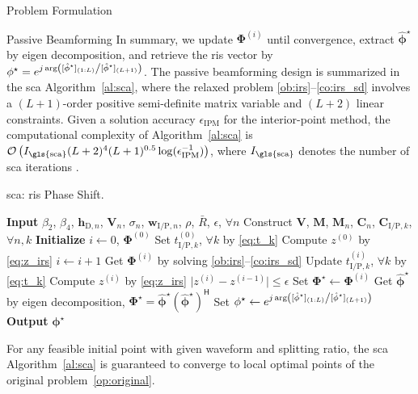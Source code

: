 \begin{section}{Problem Formulation}
\begin{subsection}{Passive Beamforming}
		In summary, we update $\mathbf{\Phi}^{(i)}$ until convergence, extract $\hat{\mathbf{\phi}}^\star$ by eigen decomposition, and retrieve the	\gls{ris} vector by $\mathbf{\phi}^{\star}=e^{j \arg\left([\hat{\mathbf{\phi}}^\star]_{(1:L)} \middle/ [\hat{\mathbf{\phi}}^\star]_{(L+1)}\right)}$. The passive beamforming design is summarized in the \gls{sca} Algorithm~\ref{al:sca}, where the relaxed problem \eqref{ob:irs}--\eqref{co:irs_sd} involves a $(L+1)$-order positive semi-definite matrix variable and $(L+2)$ linear constraints. Given a solution accuracy $\epsilon_{\mathrm{IPM}}$ for the interior-point method, the computational complexity of Algorithm~\ref{al:sca} is $\mathcal{O}\left(I_{\mathrm{\gls{sca}}}(L+2)^4 (L+1)^{0.5} \log(\epsilon_{\mathrm{IPM}}^{-1})\right)$, where $I_{\mathrm{\gls{sca}}}$ denotes the number of \gls{sca} iterations \cite{Luo2010b}.

		\begin{algorithm}[!t]
			\caption{\gls{sca}: \gls{ris} Phase Shift.}
			\label{al:sca}
			\begin{algorithmic}[1]
				\State \textbf{Input} $\beta_2$, $\beta_4$, $\mathbf{h}_{\mathrm{D},n}$, $\mathbf{V}_{n}$, $\sigma_n$, $\mathbf{w}_{\mathrm{I/P},n}$, $\rho$, $\bar{R}$, $\epsilon$, $\forall n$
				\State Construct $\mathbf{V}$, $\mathbf{M}$, $\mathbf{M}_n$, $\mathbf{C}_{n}$, $\mathbf{C}_{\mathrm{I/P},k}$, $\forall n,k$
				\State \textbf{Initialize} $i \gets 0$, $\mathbf{\Phi}^{(0)}$
				\State Set $t_{\mathrm{I/P},k}^{(0)}$, $\forall k$ by \eqref{eq:t_k}
				\State Compute $z^{(0)}$ by \eqref{eq:z_irs}
				\Repeat
					\State $i \gets i + 1$
					\State Get $\mathbf{\Phi}^{(i)}$ by solving \eqref{ob:irs}--\eqref{co:irs_sd}
					\State Update $t_{\mathrm{I/P},k}^{(i)}$, $\forall k$ by \eqref{eq:t_k}
					\State Compute $z^{(i)}$ by \eqref{eq:z_irs}
				\Until $\lvert z^{(i)}-z^{(i-1)} \rvert \le \epsilon$
				\State Set $\mathbf{\Phi}^{\star} \gets \mathbf{\Phi}^{(i)}$
				\State Get $\hat{\mathbf{\phi}}^\star$ by eigen decomposition, $\mathbf{\Phi}^{\star}=\hat{\mathbf{\phi}}^\star(\hat{\mathbf{\phi}}^\star)^\mathsf{H}$
				\State Set $\mathbf{\phi}^{\star} \gets e^{j \arg\left([\hat{\mathbf{\phi}}^\star]_{(1:L)} \middle/ [\hat{\mathbf{\phi}}^\star]_{(L+1)}\right)}$
				\State \textbf{Output} $\mathbf{\phi}^{\star}$
			\end{algorithmic}
		\end{algorithm}

		\begin{proposition}\label{pr:sca}
			For any feasible initial point with given waveform and splitting ratio, the \gls{sca} Algorithm~\ref{al:sca} is guaranteed to converge to local optimal points of the original problem~\eqref{op:original}.
		\end{proposition}


\end{subsection}
\end{section}
